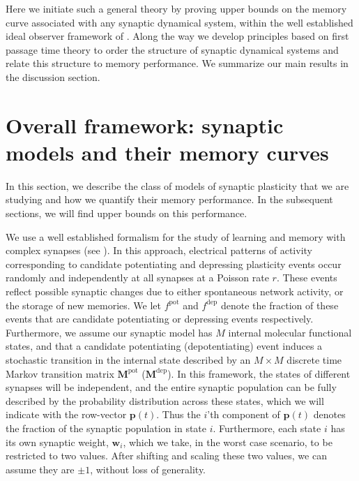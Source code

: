 \documentclass[9pt,twocolumn,twoside,lineno]{pnas-new}
\newcommand{\prob}{\mathbf{p}}
\newcommand{\w}{\mathbf{w}}
\newcommand{\M}{\mathbf{M}}
\newcommand{\pot}{^{\text{pot}}}
\newcommand{\dep}{^{\text{dep}}}
\providecommand\hyperref[2][1]{#2}
\begin{document}
Here we initiate such a general theory by proving upper bounds on the memory curve associated with any synaptic dynamical system, within the well established ideal
observer framework of \cite{Fusi2005cascade,Fusi2007multistate,Barrett2008discrete}.
Along the way we develop principles based on first passage time theory to order the structure of synaptic dynamical systems and relate this structure to memory performance.
We summarize our main results in the \hyperref[sec:disc]{discussion section}.








\section{Overall framework: synaptic models and their memory curves}\label{sec:setup}

In this section, we describe the class of models of synaptic plasticity that we are studying and how we quantify their memory performance.
In the subsequent sections, we will find upper bounds on this performance.

We use a well established formalism for the study of learning and memory with complex synapses (see \cite{Fusi2005cascade,Fusi2007multistate,Barrett2008discrete}).
In this approach, electrical patterns of activity corresponding to candidate potentiating and depressing plasticity events occur randomly and independently at all synapses at a Poisson rate $r$.  These events reflect possible synaptic changes due to either spontaneous network activity, or the storage of new memories.
We let  $f\pot$ and  $f\dep$ denote the fraction of these events that are candidate potentiating or depressing events respectively.
Furthermore, we assume our synaptic model has $M$ internal molecular functional states, and that a candidate potentiating (depotentiating) event induces a stochastic transition in the internal state described by an $M \times M$ discrete time Markov transition matrix  $\M\pot$ ($\M\dep$).
In this framework, the states of different synapses will be independent, and the entire synaptic population can be fully described by the probability distribution across these states, which we will indicate with the row-vector $\prob(t)$.
Thus the $i$'th component of $\prob(t)$ denotes the fraction of the synaptic population in state $i$.
Furthermore, each state $i$ has its own synaptic weight, $\w_i$, which we take, in the worst case scenario, to be restricted to two values.
After shifting and scaling these two values,  we can assume they are $\pm1$, without loss of generality.
\end{document}
